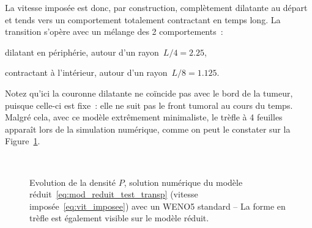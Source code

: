 \documentclass[main.tex]{subfiles}
\begin{document}
La vitesse imposée est donc, par construction, complètement dilatante au départ et tends vers un comportement totalement contractant en temps long. La transition s'opère avec un mélange des 2 comportements~:
\begin{myitemize}
\item dilatant en périphérie, autour d'un rayon~$L/4=2.25$,
\item contractant à l'intérieur, autour d'un rayon~$L/8=1.125$.
\end{myitemize}
Notez qu'ici la couronne dilatante ne coïncide pas avec le bord de la tumeur, puisque celle-ci est fixe~:  elle ne suit pas le front tumoral au cours du temps. 
Malgré cela, avec ce modèle extrêmement minimaliste, le trèfle à 4 feuilles apparaît lors de la simulation numérique, comme on peut le constater sur la Figure~\ref{fig:evo_test_transp}.
\begin{figure}
\centering
\\
\caption{Evolution de la densité $P$, solution numérique du modèle réduit~\eqref{eq:mod_reduit_test_transp} (vitesse imposée~\eqref{eq:vit_imposee}) avec un WENO5 standard -- La forme en trèfle est également visible sur le modèle réduit.\label{fig:evo_test_transp}}
\end{figure}
\end{document}

